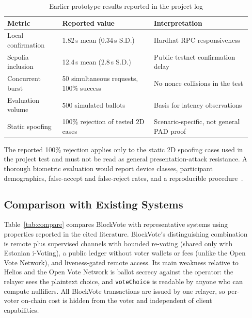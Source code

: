 \documentclass[conference]{IEEEtran}
\newcommand{\code}[1]{\texttt{\small #1}}
\begin{document}
\begin{table}[t]
\caption{Earlier prototype results reported in the project log}
\label{tab:reported}
\centering
\footnotesize
\begin{tabular}{@{}p{2.1cm}p{2.45cm}p{3.2cm}@{}}
\toprule
\textbf{Metric} & \textbf{Reported value} & \textbf{Interpretation} \\
\midrule
Local confirmation & 1.82\,s mean (0.34\,s S.D.) & Hardhat RPC responsiveness \\
Sepolia inclusion & 12.4\,s mean (2.8\,s S.D.) & Public testnet confirmation delay \\
Concurrent burst & 50 simultaneous requests, 100\% success & No nonce collisions in the test \\
Evaluation volume & 500 simulated ballots & Basis for latency observations \\
Static spoofing & 100\% rejection of tested 2D cases & Scenario-specific, not general PAD proof \\
\bottomrule
\end{tabular}
\end{table}

The reported 100\% rejection applies only to the static 2D spoofing cases used in the project test and must not be read as general presentation-attack resistance. A thorough biometric evaluation would report device classes, participant demographics, false-accept and false-reject rates, and a reproducible procedure~\cite{iso30107}.

\subsection{Comparison with Existing Systems}
Table~\ref{tab:compare} compares BlockVote with representative systems using properties reported in the cited literature. BlockVote's distinguishing combination is remote plus supervised channels with bounded re-voting (shared only with Estonian i-Voting), a public ledger without voter wallets or fees (unlike the Open Vote Network), and liveness-gated remote access. Its main weakness relative to Helios and the Open Vote Network is ballot secrecy against the operator: the relayer sees the plaintext choice, and \code{voteChoice} is readable by anyone who can compute nullifiers. All BlockVote transactions are issued by one relayer, so per-voter on-chain cost is hidden from the voter and independent of client capabilities.
\end{document}
